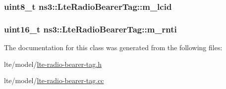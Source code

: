 \subsubsection[{\texorpdfstring{m\+\_\+lcid}{m_lcid}}]{\setlength{\rightskip}{0pt plus 5cm}uint8\+\_\+t ns3\+::\+Lte\+Radio\+Bearer\+Tag\+::m\+\_\+lcid\hspace{0.3cm}{\ttfamily [private]}}\hypertarget{classns3_1_1LteRadioBearerTag_ae069f6e1dde90d3473c153e02fd9a07f}{}\label{classns3_1_1LteRadioBearerTag_ae069f6e1dde90d3473c153e02fd9a07f}
\subsubsection[{\texorpdfstring{m\+\_\+rnti}{m_rnti}}]{\setlength{\rightskip}{0pt plus 5cm}uint16\+\_\+t ns3\+::\+Lte\+Radio\+Bearer\+Tag\+::m\+\_\+rnti\hspace{0.3cm}{\ttfamily [private]}}\hypertarget{classns3_1_1LteRadioBearerTag_a45bd7ed9cbfb44c57a284348819bd7c3}{}\label{classns3_1_1LteRadioBearerTag_a45bd7ed9cbfb44c57a284348819bd7c3}


The documentation for this class was generated from the following files\+:\begin{DoxyCompactItemize}
\item 
lte/model/\hyperlink{lte-radio-bearer-tag_8h}{lte-\/radio-\/bearer-\/tag.\+h}\item 
lte/model/\hyperlink{lte-radio-bearer-tag_8cc}{lte-\/radio-\/bearer-\/tag.\+cc}\end{DoxyCompactItemize}
